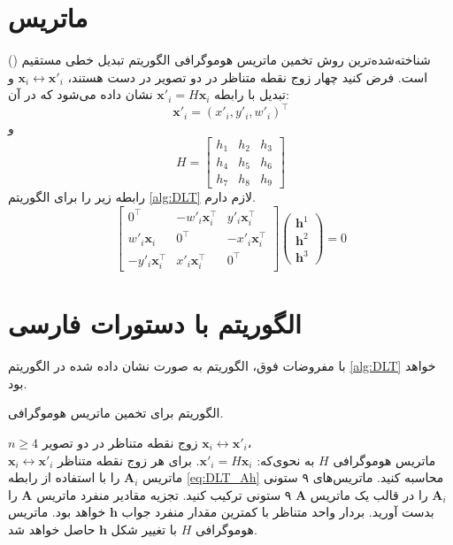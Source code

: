 \section{ماتریس}

شناخته‌شده‌ترین روش تخمین ماتریس هوموگرافی الگوریتم تبدیل خطی مستقیم () است.  فرض کنید چهار زوج نقطه متناظر در دو تصویر در دست هستند،  $\mathbf{x}_i\leftrightarrow\mathbf{x}'_i$   و تبدیل با رابطه
$\mathbf{x}'_i = H\mathbf{x}_i$
نشان داده می‌شود که در آن:
\[\mathbf{x}'_i=(x'_i,y'_i,w'_i)^\top  \]
و
\[ H=\left[
        \begin{array}{ccc}
            h_1 & h_2 & h_3 \\
            h_4 & h_5 & h_6 \\
            h_7 & h_8 & h_9
        \end{array}
        \right]\]
رابطه زیر را برای الگوریتم  \eqref{alg:DLT} لازم دارم.
\begin{equation}\label{eq:DLT_Ah}
    \left[
        \begin{array}{ccc}
            0^\top                  & -w'_i\mathbf{x}_i^\top & y'_i\mathbf{x}_i^\top  \\
            w'_i\mathbf{x}_i        & 0^\top                 & -x'_i\mathbf{x}_i^\top \\
            - y'_i\mathbf{x}_i^\top & x'_i\mathbf{x}_i^\top  & 0^\top
        \end{array}
        \right]
    \left(
    \begin{array}{c}
            \mathbf{h}^1 \\
            \mathbf{h}^2 \\
            \mathbf{h}^3
        \end{array}
    \right)=0
\end{equation}

\section{الگوریتم با دستورات فارسی}
با مفروضات فوق، الگوریتم  به صورت نشان داده شده در الگوریتم \eqref{alg:DLT}  خواهد بود.
\begin{algorithm}[t]
    \onehalfspacing
    \caption{الگوریتم  برای تخمین ماتریس هوموگرافی.} \label{alg:DLT}
    \begin{algorithmic}[1]
        \REQUIRE $n\geq4$ زوج نقطه متناظر در دو تصویر
        ${\mathbf{x}_i\leftrightarrow\mathbf{x}'_i}$،\\
        \ENSURE ماتریس هوموگرافی $H$ به نحوی‌که:
        $\mathbf{x}'_i = H \mathbf{x}_i$.
        \STATE برای هر زوج نقطه متناظر
        $\mathbf{x}_i\leftrightarrow\mathbf{x}'_i$
        ماتریس $\mathbf{A}_i$ را با استفاده از رابطه \ref{eq:DLT_Ah} محاسبه کنید.
        \STATE ماتریس‌های ۹ ستونی  $\mathbf{A}_i$ را در قالب یک ماتریس $\mathbf{A}$ ۹ ستونی ترکیب کنید.
        \STATE تجزیه مقادیر منفرد   ماتریس $\mathbf{A}$ را بدست آورید. بردار واحد متناظر با کمترین مقدار منفرد جواب $\mathbf{h}$ خواهد بود.
        \STATE  ماتریس هوموگرافی $H$ با تغییر شکل $\mathbf{h}$ حاصل خواهد شد.
    \end{algorithmic}
\end{algorithm}

